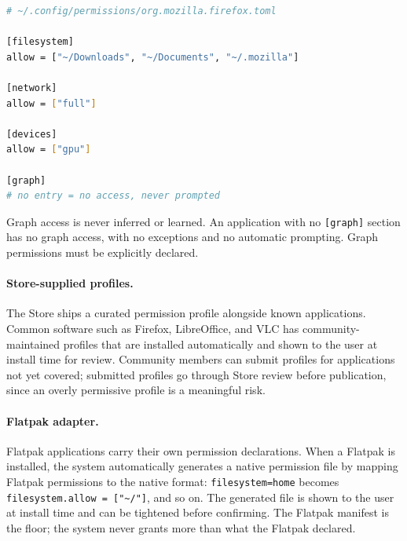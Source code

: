 \begin{lstlisting}[language=bash, caption={Example permission file}]
# ~/.config/permissions/org.mozilla.firefox.toml

[filesystem]
allow = ["~/Downloads", "~/Documents", "~/.mozilla"]

[network]
allow = ["full"]

[devices]
allow = ["gpu"]

[graph]
# no entry = no access, never prompted
\end{lstlisting}

Graph access is never inferred or learned. An application with no
\texttt{[graph]} section has no graph access, with no exceptions and no
automatic prompting. Graph permissions must be explicitly declared.

\paragraph{Store-supplied profiles.}
The Store ships a curated permission profile alongside known applications.
Common software such as Firefox, LibreOffice, and VLC has community-maintained
profiles that are installed automatically and shown to the user at install time
for review. Community members can submit profiles for applications not yet
covered; submitted profiles go through Store review before publication, since
an overly permissive profile is a meaningful risk.

\paragraph{Flatpak adapter.}
Flatpak applications carry their own permission declarations. When a Flatpak is
installed, the system automatically generates a native permission file by
mapping Flatpak permissions to the native format: \texttt{filesystem=home}
becomes \texttt{filesystem.allow = ["\textasciitilde/"]}, and so on. The
generated file is shown to the user at install time and can be tightened before
confirming. The Flatpak manifest is the floor; the system never grants more
than what the Flatpak declared.

